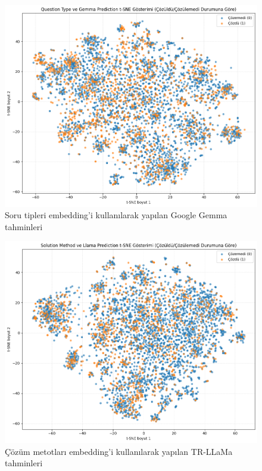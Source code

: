 \documentclass[conference]{IEEEtran}
\begin{document}
\begin{figure}[htbp]
\centering
\includegraphics[width=1\linewidth]{qt-g.png}
\caption{Soru tipleri embedding'i kullanılarak yapılan Google Gemma tahminleri}
\label{fig}
\end{figure}

\begin{figure}[htbp]
\centering
\includegraphics[width=1\linewidth]{sm-l.png}
\caption{Çözüm metotları embedding'i kullanılarak yapılan TR-LLaMa tahminleri}
\label{fig}
\end{figure}
\end{document}
